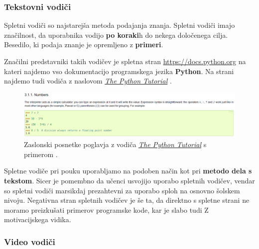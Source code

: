 
\subsubsection{Tekstovni vodiči}

Spletni vodiči so najstarejša metoda podajanja znanja. Spletni vodiči
imajo značilnost, da uporabnika vodijo \textbf{po koraki}h do nekega
določenega cilja. Besedilo, ki podaja znanje je opremljeno z
\textbf{primeri}. \cite{wiki:tutorials}

Značilni predstavniki takih vodičev je spletna stran
\url{https://docs.python.org} na kateri najdemo vso dokumentacijo
programskega jezika \textbf{Python}. Na strani najdemo tudi vodiča z
naslovom \emph{\href{https://docs.python.org/3/tutorial/index.html}{The
  Python Tutorial}} \cite{web:TPythonTut The}.

\begin{figure}[h!]
    \includegraphics [width=1\linewidth, keepaspectratio =
    1] {./images/sc_web/tPyTut_01.png}
    \caption{Zaslonski posnetke poglavja z vodiča
      \emph{\href{https://docs.python.org/3/tutorial/index.html}{The
          Python Tutorial}} s primerom \cite{web:TPythonTut}.}
    \label{fig:scr:web:tPyTut}
\end{figure}

Spletne vodiče pri pouku uporabljamo na podoben način kot pri
\textbf{metodo dela s tekstom}. Sicer je pomembno da učenci usvojijo
uporabo spletnih vodičev, vendar so spletni vodiči marsikdaj
prezahtevni za uporabo sploh na osnovno šolskem nivoju. Negativna
stran spletnih vodičev je še ta, da direktno s spletne strani ne
moramo preizkušati primerov programske kode, kar je slabo tudi Z
motivacijskega vidika.

\subsubsection{Video vodiči}
\label{sec:video_vodici}

